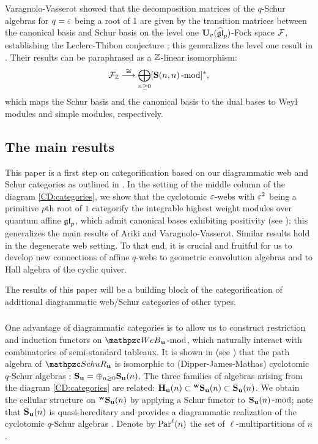 Varagnolo-Vasserot \cite{VV99} showed that the decomposition matrices of the $q$-Schur algebras for $q=\varepsilon$ being a root of 1 are given by the transition matrices between the canonical basis and Schur basis on the level one $\bold{U}_v(\widehat{\mathfrak{gl}}_p)$-Fock space $\mathcal{F}$, establishing the Leclerc-Thibon conjecture \cite{LT96}; this generalizes the level one result in \cite{LLT96, Ar96}. Their results can be paraphrased as a $\mathbb{Z}$-linear isomorphism:
\begin{align}  \label{eq:VV}
     \mathcal{F}_{\mathbb{Z}} \stackrel{\cong}{\longrightarrow} \bigoplus_{n\ge 0} [\mathbf{S}(n,n)\operatorname{-mod}\nolimits]^*,
\end{align}
which maps the Schur basis and the canonical basis to the dual bases to Weyl modules and simple modules, respectively. 

\subsection{The main results}

This paper is a first step on categorification based on our diagrammatic web and Schur categories as outlined in \cite{SW25web, SW24Schur}. In the setting of the middle column of the diagram \eqref{CD:categories}, we show that the cyclotomic $\varepsilon$-webs with $\varepsilon^2$ being a primitive $p$th root of $1$ categorify the integrable highest weight modules over quantum affine $\mathfrak{gl}_p$, which admit canonical bases exhibiting positivity (see \cite{Sch00}); this generalizes the main results of Ariki and Varagnolo-Vasserot. Similar results hold in the degenerate web setting. To that end, it is crucial and fruitful for us to develop new connections of affine $q$-webs to geometric convolution algebras and to Hall algebra of the cyclic quiver. 

The results of this paper will be a building block of the categorification of additional diagrammatic web/Schur categories of other types. 

\subsubsection{}

One advantage of diagrammatic categories is to allow us to construct restriction and induction functors on $\qW_{\bfu} \modf$, which naturally interact with combinatorics of semi-standard tableaux. It is shown in \cite{SSW25} (see \cite{SW24Schur}) that the path algebra of $\qSch_\bfu$ is isomorphic to (Dipper-James-Mathas) cyclotomic $q$-Schur algebras \cite{DJM98}: $\mathbf{S}_{\mathbf{u}}=\oplus_{n\ge 0} \mathbf{S}_{\mathbf{u}}(n)$. The three families of algebras arising from the diagram \eqref{CD:categories} are related: $\mathbf{H}_{\mathbf{u}}(n)\subset {}^{\bold{w}}\bold{S}_{\mathbf{u}}(n) \subset \mathbf{S}_{\mathbf{u}}(n)$. We obtain the cellular structure on ${}^{\bold{w}}\bold{S}_{\mathbf{u}}(n)$ by applying a Schur functor to $\mathbf{S}_{\mathbf{u}}(n)\operatorname{-mod}\nolimits$; note that $\mathbf{S}_{\mathbf{u}}(n)$ is quasi-hereditary \cite{SSW25} and provides a diagrammatic realization of the cyclotomic $q$-Schur algebras \cite{DJM98}. Denote by $\text{Par}^\ell(n)$ the set of $\ell$-multipartitions of $n$.


